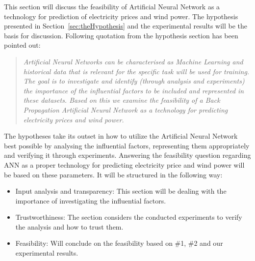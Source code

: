 This section will discuss the feasibility of Artificial Neural Network as a technology for prediction of electricity prices and wind power. The hypothesis presented in Section~\ref{sec:theHypothesis} and the experimental results will be the basis for discussion. Following quotation from the hypothesis section has been pointed out:

\begin{quotation}
\textit{Artificial Neural Networks can be characterised as Machine Learning\cite{18} and historical data that is relevant for the specific task will be used for training. The goal is to investigate and identify (through analysis and experiments) the importance of the influential factors to be included and represented in these datasets. Based on this we examine the feasibility of a Back Propagation Artificial Neural Network as a technology for predicting electricity prices and wind power.}
\end{quotation}

\noindent The hypotheses take its outset in how to utilize the Artificial Neural Network best possible by analysing the influential factors, representing them appropriately and verifying it through experiments. Answering the feasibility question regarding ANN as a proper technology for predicting electricity price and wind power will be based on these parameters. It will be structured in the following way:

\begin{itemize}
\item Input analysis and transparency: This section will be dealing with the importance of investigating the influential factors.
\item Trustworthiness: The section considers the conducted experiments to verify the analysis and how to trust them.
\item Feasibility: Will conclude on the feasibility based on \#1, \#2 and our experimental results.
\end{itemize}

